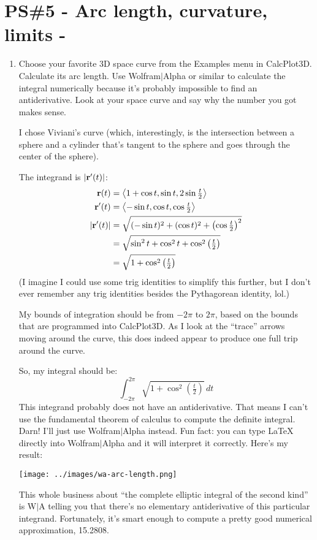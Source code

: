 


%


\allowdisplaybreaks
\section{PS\#5 - Arc length, curvature, limits -  }

\begin{enumerate}[leftmargin=0pt]
    \item Choose your favorite 3D space curve from the Examples menu in CalcPlot3D. Calculate its arc length. Use Wolfram$|$Alpha or similar to calculate the integral numerically because it's probably impossible to find an antiderivative. Look at your space curve and say why the number you got makes sense.
        
    \begin{red}
    I chose Viviani's curve (which, interestingly, is the intersection between a sphere and a cylinder that's tangent to the sphere and goes through the center of the sphere).
    
    The integrand is $|\mathbf{r}'(t)|$:
    \begin{align*}
        \mathbf{r}(t) &= \left\langle 1 + \cos t, \sin t, 2 \sin \tfrac{t}{2} \right\rangle \\
        \mathbf{r}'(t) &= \left\langle -\sin t, \cos t, \cos \tfrac{t}{2} \right\rangle \\
        |\mathbf{r}'(t)| &= \sqrt{ 
        (-\sin t)^2 + (\cos t)^2 + \left(\cos \tfrac{t}{2}\right)^2
        }\\
        &= \sqrt{\sin^2 t + \cos^2 t + \cos^2\left(\tfrac{t}{2}\right)} \\
        &= \sqrt{1 + \cos^2\left(\tfrac{t}{2}\right)}
    \end{align*}
    (I imagine I could use some trig identities to simplify this further, but I don't ever remember any trig identities besides the Pythagorean identity, lol.)
    
    My bounds of integration should be from $-2\pi$ to $2\pi$, based on the bounds that are programmed into CalcPlot3D. As I look at the ``trace'' arrows moving around the curve, this does indeed appear to produce one full trip around the curve.
    
    So, my integral should be:
    \[ \int_{-2\pi}^{2\pi} \sqrt{1 + \cos^2\left(\tfrac{t}{2}\right)} \, dt \]
    This integrand probably does not have an antiderivative. That means I can't use the fundamental theorem of calculus to compute the definite integral. Darn! I'll just use Wolfram$|$Alpha instead. Fun fact: you can type LaTeX directly into Wolfram$|$Alpha and it will interpret it correctly. Here's my result:
    \begin{center}
        \texttt{[image: ../images/wa-arc-length.png]}
    \end{center}
    This whole business about ``the complete elliptic integral of the second kind'' is W$|$A telling you that there's no elementary antiderivative of this particular integrand. Fortunately, it's smart enough to compute a pretty good numerical approximation, 15.2808.
    

\end{red}
\end{enumerate}
